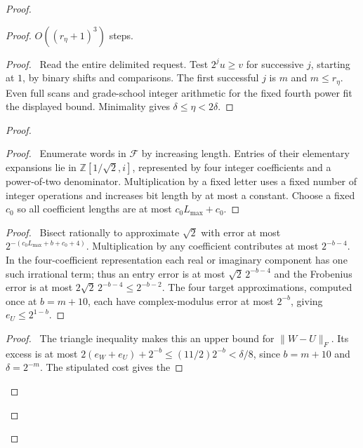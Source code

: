 \begin{proof}
\begin{proof}
{  $O((r_\eta+1)^3)$ steps.}
  \begin{proof}\pf\ Read the entire delimited request. Test
  $2^j u\geq v$ for successive $j$, starting at $1$, by binary
  shifts and comparisons. The first successful $j$ is $m$ and
  $m\leq r_\eta$. Even full scans and grade-school integer
  arithmetic for the fixed fourth power fit the displayed bound.
  Minimality gives $\delta\leq\eta<2\delta$.
  \end{proof}
\begin{proof}
 \begin{proof}\pf\ Enumerate words in $\mathcal F$ by increasing
 length. Entries of their elementary expansions lie in
 $\mathbb Z[1/\sqrt2,i]$, represented by four integer coefficients
 and a power-of-two denominator. Multiplication by a fixed letter
 uses a fixed number of integer operations and increases bit length
 by at most a constant. Choose a fixed $c_0$ so all coefficient
 lengths are at most $c_0L_{\max}+c_0$.\end{proof}
 \begin{proof}\pf\ Bisect rationally to approximate $\sqrt2$ with
 error at most $2^{-(c_0L_{\max}+b+c_0+4)}$. Multiplication by any coefficient
 contributes at most $2^{-b-4}$. In the four-coefficient representation
 each real or imaginary component has one such irrational term;
 thus an entry error is at most $\sqrt2\,2^{-b-4}$ and the
 Frobenius error is at most $2\sqrt2\,2^{-b-4}\leq2^{-b-2}$.
 The four target approximations, computed once at $b=m+10$, each
 have complex-modulus error at most $2^{-b}$, giving $e_U\leq2^{1-b}$.
 \end{proof}
 \begin{proof}\pf\ The triangle inequality makes this an upper
 bound for $\|W-U\|_F$. Its excess is at most
 $2(e_W+e_U)+2^{-b}\leq(11/2)2^{-b}<\delta/8$, since
 $b=m+10$ and $\delta=2^{-m}$. The stipulated cost gives the

\end{proof}
\end{proof}
\end{proof}
\end{proof}
